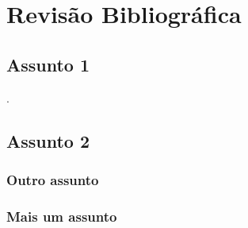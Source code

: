 \section{Revisão Bibliográfica}

\lipsum[1-5]

\subsection{Assunto 1}
\lipsum[6] .

\subsection{Assunto 2}
\subsubsection{Outro assunto}
\lipsum[7-10]

\subsubsection{Mais um assunto}

\lipsum[7-10]
